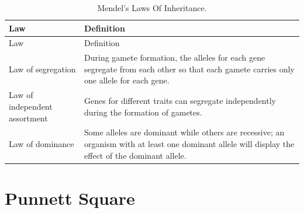 \documentclass[]{book}
\theoremstyle{definition}
\theoremstyle{definition}
\theoremstyle{definition}
\theoremstyle{remark}
\begin{document}
\begin{longtable}[]{@{}ll@{}}
\caption{\label{tab:mendel} Mendel's Laws Of Inheritance.}\tabularnewline
\toprule
\begin{minipage}[b]{0.05\columnwidth}\raggedright\strut
Law\strut
\end{minipage} & \begin{minipage}[b]{0.14\columnwidth}\raggedright\strut
Definition\strut
\end{minipage}\tabularnewline
\midrule
\endfirsthead
\toprule
\begin{minipage}[b]{0.05\columnwidth}\raggedright\strut
Law\strut
\end{minipage} & \begin{minipage}[b]{0.14\columnwidth}\raggedright\strut
Definition\strut
\end{minipage}\tabularnewline
\midrule
\endhead
\begin{minipage}[t]{0.05\columnwidth}\raggedright\strut
Law of segregation\strut
\end{minipage} & \begin{minipage}[t]{0.14\columnwidth}\raggedright\strut
During gamete formation, the alleles for each gene segregate from each
other so that each gamete carries only one allele for each gene.\strut
\end{minipage}\tabularnewline
\begin{minipage}[t]{0.05\columnwidth}\raggedright\strut
Law of independent assortment\strut
\end{minipage} & \begin{minipage}[t]{0.14\columnwidth}\raggedright\strut
Genes for different traits can segregate independently during the
formation of gametes.\strut
\end{minipage}\tabularnewline
\begin{minipage}[t]{0.05\columnwidth}\raggedright\strut
Law of dominance\strut
\end{minipage} & \begin{minipage}[t]{0.14\columnwidth}\raggedright\strut
Some alleles are dominant while others are recessive; an organism with
at least one dominant allele will display the effect of the dominant
allele.\strut
\end{minipage}\tabularnewline
\bottomrule
\end{longtable}

\section{Punnett Square}\label{punnett-square}
\end{document}
